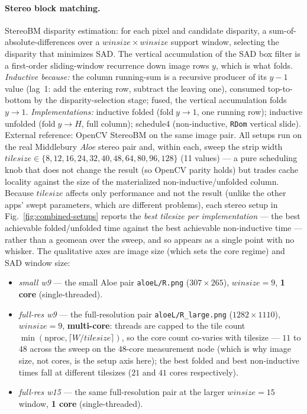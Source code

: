 \paragraph{Stereo block matching.}
StereoBM disparity estimation: for each pixel and candidate disparity, a
sum-of-absolute-differences over a $\mathit{winsize}\times\mathit{winsize}$ support
window, selecting the disparity that minimizes SAD. The vertical accumulation of
the SAD box filter is a first-order sliding-window recurrence down image rows $y$,
which is what folds.
\emph{Inductive because:} the column running-sum is a recursive producer of its
$y{-}1$ value (lag~1: add the entering row, subtract the leaving one), consumed
top-to-bottom by the disparity-selection stage; fused, the vertical accumulation
folds $y\!\to\!1$.
\emph{Implementations:} inductive folded ($\mathrm{fold}\;y\!\to\!1$, one running
row); inductive unfolded ($\mathrm{fold}\;y\!\to\!H$, full column); schedule4
(non-inductive, \texttt{RDom} vertical slide). External reference: OpenCV StereoBM
on the same image pair.
All setups run on the real Middlebury \emph{Aloe} stereo pair and, within each,
sweep the strip width $\mathit{tilesize}\in\{8,12,16,24,32,40,48,64,80,96,128\}$
(11 values) --- a pure scheduling knob that does not change the result (so OpenCV
parity holds) but trades cache locality against the size of the materialized
non-inductive/unfolded column. Because $\mathit{tilesize}$ affects only
performance and not the result (unlike the other apps' swept parameters, which are
different problems), each stereo setup in Fig.~\ref{fig:combined-setups} reports
the \emph{best tilesize per implementation} --- the best achievable folded/unfolded
time against the best achievable non-inductive time --- rather than a geomean over
the sweep, and so appears as a single point with no whisker. The qualitative axes
are image size (which sets the core regime) and SAD window size:
\begin{itemize}\itemsep2pt
  \item \textit{small w9} --- the small Aloe pair \texttt{aloeL/R.png}
    ($307\times265$), $\mathit{winsize}{=}9$, \textbf{1 core} (single-threaded).
  \item \textit{full-res w9} --- the full-resolution pair
    \texttt{aloeL/R\_large.png} ($1282\times1110$), $\mathit{winsize}{=}9$,
    \textbf{multi-core}: threads are capped to the tile count
    $\min(\mathrm{nproc},\lceil W/\mathit{tilesize}\rceil)$, so the core count
    co-varies with tilesize --- $11$ to $48$ across the sweep on the $48$-core
    measurement node (which is why image size, not cores, is the setup axis here);
    the best folded and best non-inductive times fall at different tilesizes ($21$
    and $41$ cores respectively).
  \item \textit{full-res w15} --- the same full-resolution pair at the larger
    $\mathit{winsize}{=}15$ window, \textbf{1 core} (single-threaded).
\end{itemize}

